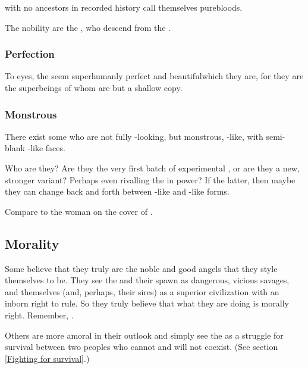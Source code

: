\Resphain{} with no \human{} ancestors in recorded history call themselves purebloods. 

The \resphan{} nobility are the \ketherain, who descend from the \satharioth. 





\subsubsection{Perfection}
To \human{} eyes, the \resphain{} seem superhumanly perfect and beautiful\dash which they are, for they are the superbeings of whom \humans{} are but a shallow copy. 





\subsubsection{Monstrous \resphain}
There exist some \resphain{} who are not fully \human-looking, but monstrous, \bane-like, with semi-blank \bane-like faces. 

Who are they? Are they the very first batch of experimental \resphain, or are they a new, stronger variant? Perhaps even rivalling the \satharioth{} in power? If the latter, then maybe they can change back and forth between \human-like and \bane-like forms. 

Compare to the woman on the cover of .







\subsection{Morality}
Some \resphain{} believe that they truly are the noble and good angels that they style themselves to be. They see the \dragons{} and their spawn as dangerous, vicious savages, and themselves (and, perhaps, their \bane{} sires) as a superior civilization with an inborn right to rule. So they truly believe that what they are doing is morally right. Remember, .

Others are more amoral in their outlook and simply see the \secretwar{} as a struggle for survival between two peoples who cannot and will not coexist. (See section \ref{Fighting for survival}.)







